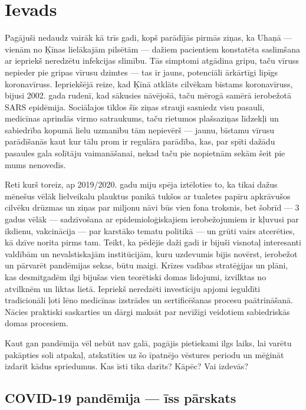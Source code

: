 \documentclass[12pt, a4paper]{article}
\numberwithin{equation}{section} %
\begin{document}

\newpage
\tableofcontents
\thispagestyle{empty}
\newpage
\setcounter{page}{3}


\section{Ievads}

Pagājuši nedaudz vairāk kā trīs gadi, kopš parādījās pirmās ziņas, ka Uhaņā --- vienām no Ķīnas lielākajām pilsētām --- dažiem pacientiem konstatēta saslimšana ar iepriekš neredzētu infekcijas slimību. Tās simptomi atgādina gripu, taču vīruss nepieder pie gripas vīrusu dzimtes --- tas ir jauns, potenciāli ārkārtīgi lipīgs koronavīruss. Iepriekšējā reize, kad Ķīnā atklāts cilvēkam bīstams koronavīruss, bijusi 2002. gada rudenī, kad sākusies nāvējošā, taču mērogā samērā ierobežotā SARS epidēmija. Sociālajos tīklos šīs ziņas strauji sasniedz visu pasauli, medicīnas aprindās virmo satraukums, taču rietumos plašsaziņas līdzekļi un sabiedrība kopumā lielu uzmanību tām nepievērš --- jaunu, bīstamu vīrusu parādīšanās kaut kur tālu prom ir regulāra parādība, kas, par spīti dažādu pasaules gala solītāju vaimanāšanai, nekad taču pie nopietnām sekām šeit pie mums nenovedīs. 

Reti kurš toreiz, ap 2019/2020. gadu miju spēja iztēloties to, ka tikai dažus mēnešus vēlāk lielveikalu plauktus panikā tukšos ar tualetes papīru apkrāvušos cilvēku drūzmas un ziņas par miljonu nāvi būs vien fona troksnis, bet šobrīd --- 3 gadus vēlāk --- sadzīvošana ar epidemioloģiskajiem ierobežojumiem ir kļuvusi par ikdienu, vakcinācija --- par karstāko tematu politikā --- un grūti vairs atcerēties, kā dzīve norita pirms tam. Teikt, ka pēdējie daži gadi ir bijuši visnotaļ interesanti valdībām un nevalstiskajām institūcijām, kuru uzdevumis bijis novērst, ierobežot un pārvarēt pandēmijas sekas, būtu maigi. Krīzes vadības stratēģijas un plāni, kas desmitgadēm ilgi bijušas vien teorētiski domas lidojumi, izvilktas no atvilknēm un liktas lietā. Iepriekš neredzēti investīciju apjomi ieguldīti tradicionāli ļoti lēno medicīnas izstrādes un sertificēšanas procesu paātrināšanā. Nācies praktiski saskarties un dārgi maksāt par nevīžīgi veidotiem sabiedriskās domas procesiem. 

Kaut gan pandēmija vēl nebūt nav galā, pagājis pietiekami ilgs laiks, lai varētu pakāpties soli atpakaļ, atskatīties uz šo īpatnējo vēstures periodu un mēģināt izdarīt kādus spriedumus. Kas īsti tika darīts? Kāpēc? Vai izdevās?

\subsection{COVID-19 pandēmija --- īss pārskats}
\end{document}
